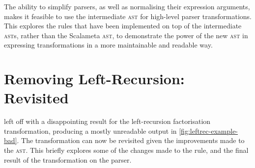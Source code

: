 \documentclass[../../main.tex]{subfiles}
\begin{document}
\label{sec:complex-rules}
The ability to simplify parsers, as well as normalising their expression arguments, makes it feasible to use the intermediate  \textsc{ast} for high-level parser transformations.
This  explores the rules that have been implemented on top of the intermediate \textsc{ast}s, rather than the Scalameta \textsc{ast}, to demonstrate the power of the new  \textsc{ast} in expressing transformations in a more maintainable and readable way.

\section{Removing Left-Recursion: Revisited}\label{sec:leftrec-revisited}
 left off with a disappointing result for the left-recursion factorisation transformation, producing a mostly unreadable output in \cref{fig:leftrec-example-bad}.
The transformation can now be revisited given the improvements made to the  \textsc{ast}.
This  briefly explores some of the changes made to the rule, and the final result of the transformation on the  parser.
\end{document}
